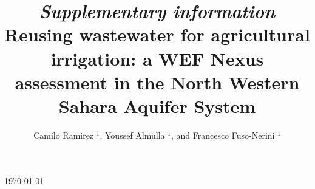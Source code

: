 \documentclass[12pt]{iopart}
\begin{document}
\title[\textit{SI} - Reusing wastewater in agriculture: a WEF Nexus assessment in the NWSAS]{\textit{Supplementary information}\\[12pt] \large Reusing wastewater for agricultural irrigation: a WEF Nexus assessment in the North Western Sahara Aquifer System}


\author{Camilo Ramirez $^{1}$, Youssef Almulla $^{1}$, and Francesco Fuso-Nerini $^{1}$}

\address{$^{1}$ KTH Royal Institute of Technology, Stockholm, Sweden}
\vspace{10pt}
\begin{indented}
\item[]\today
\end{indented}

\tableofcontents
\end{document}
